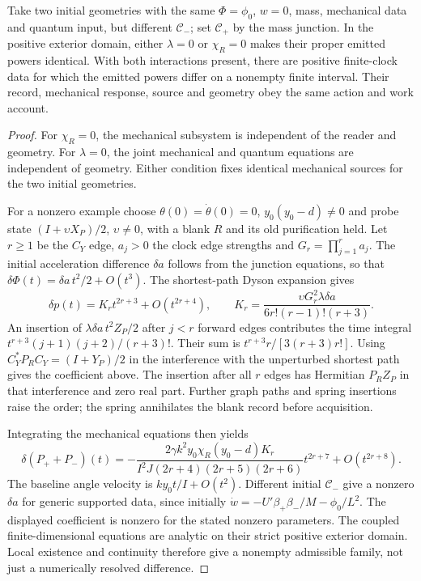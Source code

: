 \begin{proposition}
\label{prop:record-mediated-source}
Take two initial geometries with the same $\Phi=\phi_0$, $w=0$, mass,
mechanical data and quantum input, but different $\mathcal C_-$;
set $\mathcal C_+$ by the mass junction. In the positive exterior domain,
either $\lambda=0$ or $\chi_R=0$ makes their proper emitted powers
identical. With both interactions present, there are positive finite-clock
data for which the emitted powers differ on a nonempty finite interval.
Their record, mechanical response, source and geometry obey the same action
and work account.
\end{proposition}
\begin{proof}
For $\chi_R=0$, the mechanical subsystem is independent of the reader
and geometry. For $\lambda=0$, the joint mechanical and quantum equations
are independent of geometry. Either condition fixes identical mechanical
sources for the two initial geometries.

For a nonzero example choose $\theta(0)=\dot\theta(0)=0$,
$y_0(y_0-d)\ne0$ and probe state $(I+\upsilon X_P)/2$, $\upsilon\ne0$,
with a blank $R$ and its old purification held. Let $r\ge1$ be the
$C_Y$ edge, $a_j>0$ the clock edge strengths and
$G_r=\prod_{j=1}^r a_j$. The initial acceleration difference
$\delta a$ follows from the junction equations, so that
$\delta\Phi(t)=\delta a\,t^2/2+O(t^3)$.
The shortest-path Dyson expansion gives
\begin{equation}\label{eq:record-spring-leading-record}
 \delta p(t)=K_r t^{2r+3}+O(t^{2r+4}),\qquad
 K_r=\frac{\upsilon G_r^2\lambda\delta a}
             {6r!(r-1)!(r+3)}.
\end{equation}
An insertion of $\lambda\delta a\,t^2Z_P/2$ after $j<r$ forward
edges contributes the time integral
$t^{r+3}(j+1)(j+2)/(r+3)!$.
Their sum is $t^{r+3}r/[3(r+3)r!]$.
Using $C_Y^*P_RC_Y=(I+Y_P)/2$ in the interference with the unperturbed
shortest path gives the coefficient above. The insertion after all
$r$ edges has Hermitian $P_RZ_P$ in that interference and zero real
part. Further graph paths and spring insertions raise the order;
the spring annihilates the blank record before acquisition.

Integrating the mechanical equations then yields
\begin{equation}\label{eq:record-spring-leading-source}
 \delta(P_++P_-)(t)=
 -\frac{2\gamma k^2 y_0\chi_R(y_0-d)K_r}
 {I^2J(2r+4)(2r+5)(2r+6)}t^{2r+7}+O(t^{2r+8}).
\end{equation}
The baseline angle velocity is $ky_0t/I+O(t^2)$.
Different initial $\mathcal C_-$ give a nonzero $\delta a$ for generic
supported data, since initially
$\dot w=-U'\beta_+\beta_-/M-\phi_0/L^2$.
The displayed coefficient is nonzero for the stated nonzero parameters.
The coupled finite-dimensional equations are analytic on their strict
positive exterior domain. Local existence and continuity therefore give
a nonempty admissible family, not just a numerically resolved difference.
\end{proof}

